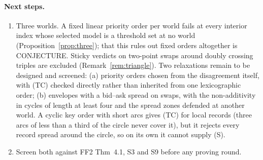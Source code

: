 \documentclass[11pt]{article}
\theoremstyle{definition}\newtheorem{definition}[theorem]{Definition}
\theoremstyle{remark}\newtheorem{remark}[theorem]{Remark}
\begin{document}
\paragraph{Next steps.}
\begin{enumerate}[leftmargin=*,itemsep=2pt]
\item Three worlds. A fixed linear priority order per world fails at every
interior index whose selected model is a threshold set at no world
(Proposition~\ref{prop:three}); that this rules out fixed orders altogether is
CONJECTURE. Sticky verdicts on two-point swaps around
doubly crossing triples are excluded (Remark~\ref{rem:triangle}). Two relaxations remain to be designed and
screened: (a) priority orders chosen from the disagreement itself, with (TC)
checked directly rather than inherited from one lexicographic order; (b)
envelopes with a bid--ask spread on swaps, with the non-additivity in cycles
of length at least four and the spread zones defended at another world. A
cyclic key order with short arcs gives (TC) for local records (three arcs of
less than a third of the circle never cover it), but it rejects every record
spread around the circle, so on its own it cannot supply (S).
\item Screen both against FF2 Thm~4.1, S3 and S9 before any proving round.
\end{enumerate}
\end{document}
